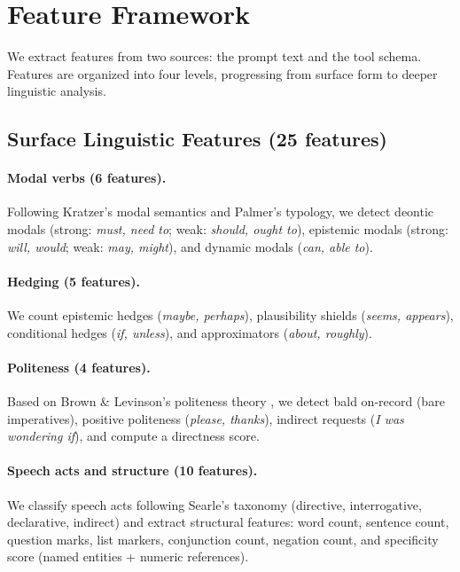 \documentclass{article}
\begin{document}
\section{Feature Framework}
\label{sec:features}

We extract features from two sources: the prompt text and the tool schema. Features are organized into four levels, progressing from surface form to deeper linguistic analysis.

\subsection{Surface Linguistic Features (25 features)}

\paragraph{Modal verbs (6 features).}
Following Kratzer's modal semantics \citep{kratzer1991modality} and Palmer's typology, we detect deontic modals (strong: \emph{must, need to}; weak: \emph{should, ought to}), epistemic modals (strong: \emph{will, would}; weak: \emph{may, might}), and dynamic modals (\emph{can, able to}).

\paragraph{Hedging (5 features).}
We count epistemic hedges (\emph{maybe, perhaps}), plausibility shields (\emph{seems, appears}), conditional hedges (\emph{if, unless}), and approximators (\emph{about, roughly}).

\paragraph{Politeness (4 features).}
Based on Brown \& Levinson's politeness theory \citep{brown1987politeness}, we detect bald on-record (bare imperatives), positive politeness (\emph{please, thanks}), indirect requests (\emph{I was wondering if}), and compute a directness score.

\paragraph{Speech acts and structure (10 features).}
We classify speech acts following Searle's taxonomy (directive, interrogative, declarative, indirect) and extract structural features: word count, sentence count, question marks, list markers, conjunction count, negation count, and specificity score (named entities + numeric references).
\end{document}
